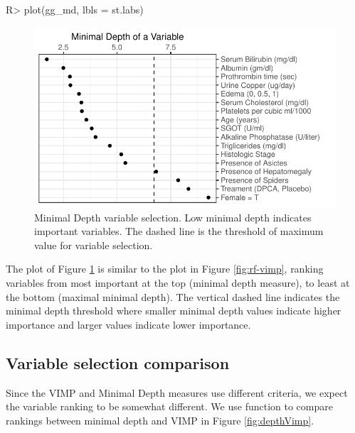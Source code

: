 \documentclass[article]{jss}
\begin{document}
\begin{Schunk}
\begin{Sinput}
R> plot(gg_md, lbls = st.labs)
\end{Sinput}
\begin{figure}[!htb]

{\centering \includegraphics{fig-rfs/rfs-mindepth-plot-1} 

}

\caption[Minimal Depth variable selection]{Minimal Depth variable selection. Low minimal depth indicates important variables. The dashed line is the threshold of maximum value for variable selection.}\label{fig:mindepth-plot}
\end{figure}
\end{Schunk}

The  plot of Figure \ref{fig:mindepth-plot} is
similar to the  plot in Figure \ref{fig:rf-vimp}, ranking
variables from most important at the top (minimal depth measure), to
least at the bottom (maximal minimal depth). The vertical dashed line
indicates the minimal depth threshold where smaller minimal depth values
indicate higher importance and larger values indicate lower importance.

\subsection{Variable selection
comparison}\label{variable-selection-comparison}

Since the VIMP and Minimal Depth measures use different criteria, we
expect the variable ranking to be somewhat different. We use
 function to compare rankings between minimal
depth and VIMP in Figure \ref{fig:depthVimp}.
\end{document}
